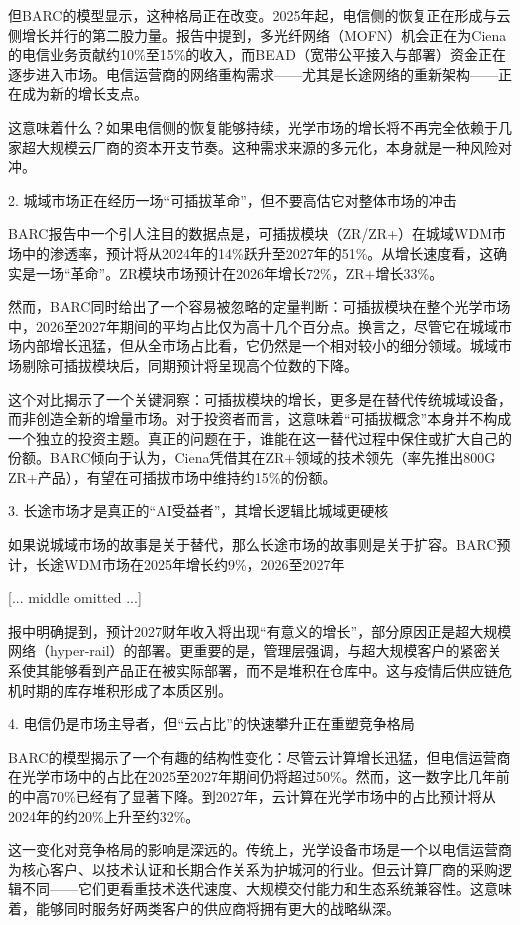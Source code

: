 \documentclass[11pt]{ctexart}
\begin{document}
但BARC的模型显示，这种格局正在改变。2025年起，电信侧的恢复正在形成与云侧增长并行的第二股力量。报告中提到，多光纤网络（MOFN）机会正在为Ciena的电信业务贡献约10\%至15\%的收入，而BEAD（宽带公平接入与部署）资金正在逐步进入市场。电信运营商的网络重构需求——尤其是长途网络的重新架构——正在成为新的增长支点。

这意味着什么？如果电信侧的恢复能够持续，光学市场的增长将不再完全依赖于几家超大规模云厂商的资本开支节奏。这种需求来源的多元化，本身就是一种风险对冲。

2. 城域市场正在经历一场“可插拔革命”，但不要高估它对整体市场的冲击

BARC报告中一个引人注目的数据点是，可插拔模块（ZR/ZR+）在城域WDM市场中的渗透率，预计将从2024年的14\%跃升至2027年的51\%。从增长速度看，这确实是一场“革命”。ZR模块市场预计在2026年增长72\%，ZR+增长33\%。

然而，BARC同时给出了一个容易被忽略的定量判断：可插拔模块在整个光学市场中，2026至2027年期间的平均占比仅为高十几个百分点。换言之，尽管它在城域市场内部增长迅猛，但从全市场占比看，它仍然是一个相对较小的细分领域。城域市场剔除可插拔模块后，同期预计将呈现高个位数的下降。

这个对比揭示了一个关键洞察：可插拔模块的增长，更多是在替代传统城域设备，而非创造全新的增量市场。对于投资者而言，这意味着“可插拔概念”本身并不构成一个独立的投资主题。真正的问题在于，谁能在这一替代过程中保住或扩大自己的份额。BARC倾向于认为，Ciena凭借其在ZR+领域的技术领先（率先推出800G ZR+产品），有望在可插拔市场中维持约15\%的份额。

3. 长途市场才是真正的“AI受益者”，其增长逻辑比城域更硬核

如果说城域市场的故事是关于替代，那么长途市场的故事则是关于扩容。BARC预计，长途WDM市场在2025年增长约9\%，2026至2027年

[... middle omitted ...]

报中明确提到，预计2027财年收入将出现“有意义的增长”，部分原因正是超大规模网络（hyper-rail）的部署。更重要的是，管理层强调，与超大规模客户的紧密关系使其能够看到产品正在被实际部署，而不是堆积在仓库中。这与疫情后供应链危机时期的库存堆积形成了本质区别。

4. 电信仍是市场主导者，但“云占比”的快速攀升正在重塑竞争格局

BARC的模型揭示了一个有趣的结构性变化：尽管云计算增长迅猛，但电信运营商在光学市场中的占比在2025至2027年期间仍将超过50\%。然而，这一数字比几年前的中高70\%已经有了显著下降。到2027年，云计算在光学市场中的占比预计将从2024年的约20\%上升至约32\%。

这一变化对竞争格局的影响是深远的。传统上，光学设备市场是一个以电信运营商为核心客户、以技术认证和长期合作关系为护城河的行业。但云计算厂商的采购逻辑不同——它们更看重技术迭代速度、大规模交付能力和生态系统兼容性。这意味着，能够同时服务好两类客户的供应商将拥有更大的战略纵深。
\end{document}

